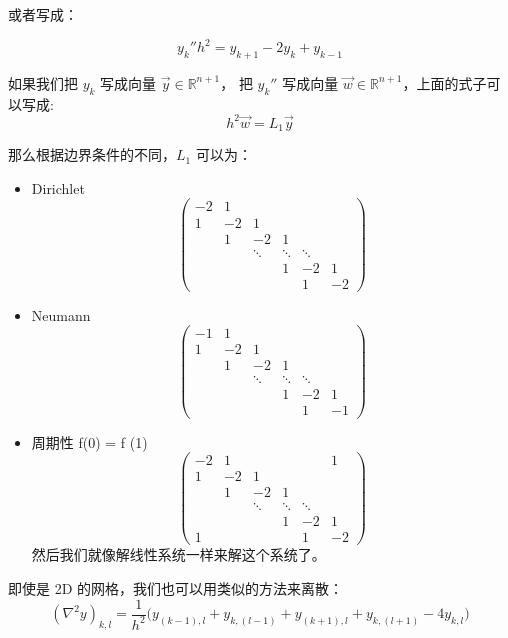 \documentclass[
]{book}
\begin{document}
或者写成：

\[
y_k'' h^2 =  y_{k+1} - 2 y_k + y_{k-1}
\]

如果我们把 \(y_k\) 写成向量 \(\vec{y} \in \mathbb{R}^{n+1}\)， 把 \(y_k''\) 写成向量 \(\vec{w} \in \mathbb{R}^{n+1}\)，上面的式子可以写成:
\[
h^2 \vec{w} = L_1\vec{y}
\]

那么根据边界条件的不同，\(L_1\) 可以为：

\begin{itemize}
\item
  Dirichlet
  \[
  {\begin{pmatrix}-2 & 1 & & & &  \\1 & -2 & 1 & & & \\ & 1 &-2&1& \\& &\ddots&\ddots&\ddots& \\ &  & & 1& -2& 1  \\ &  & & &1&-2 \end{pmatrix}}
  \]
\item
  Neumann
  \[
  {\begin{pmatrix}-1 & 1 & & & &  \\1 & -2 & 1 & & & \\ & 1 &-2&1& \\& &\ddots&\ddots&\ddots& \\ &  & & 1& -2& 1  \\ &  & & &1&-1 \end{pmatrix}}
  \]
\item
  周期性 f(0) = f (1)
  \[
  {\begin{pmatrix}-2 & 1 & & & &1  \\1 & -2 & 1 & & & \\ & 1 &-2&1& \\& &\ddots&\ddots&\ddots& \\ &  & & 1& -2& 1  \\1 &  & & &1&-2 \end{pmatrix}}
  \]
  然后我们就像解线性系统一样来解这个系统了。
\end{itemize}

即使是 2D 的网格，我们也可以用类似的方法来离散：
\[
(\nabla^2 y)_{k,l} = \frac{1}{h^2} \big( y_{(k-1),l} + y_{k, (l-1)} + y_{(k+1), l} + y_{k,(l+1)} - 4 y_{k,l} \big)
\]

  
\end{document}
